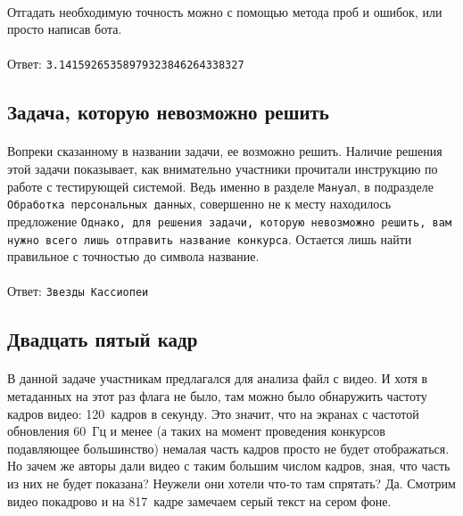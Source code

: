 \documentclass[12pt]{article}
\begin{document}
    \paragraph{}
    Отгадать необходимую точность можно с помощью метода проб и ошибок, или просто написав бота.
    \paragraph{}
    Ответ: \verb|3.14159265358979323846264338327|


    \subsection{Задача, которую невозможно решить}
	\paragraph{}
    Вопреки сказанному в названии задачи, ее возможно решить.
	Наличие решения этой задачи показывает,
	как внимательно участники прочитали инструкцию по работе с тестирующей системой.
	Ведь именно в разделе \verb|Мануал|, в подразделе \verb|Обработка персональных данных|,
	совершенно не к месту находилось предложение
    \verb|Однако, для решения задачи, которую невозможно решить, вам нужно всего лишь отправить название конкурса|.
	Остается лишь найти правильное с точностью до символа название.
    \paragraph{}
    Ответ: \verb|Звезды Кассиопеи|


    \subsection{Двадцать пятый кадр}
	\paragraph{}
    В данной задаче участникам предлагался для анализа файл с видео.
	И хотя в метаданных на этот раз флага не было, там можно было обнаружить частоту кадров видео: 120~кадров в секунду.
	Это значит, что на экранах с частотой обновления 60~Гц и менее
	(а таких на момент проведения конкурсов подавляющее большинство)
	немалая часть кадров просто не будет отображаться.
	Но зачем же авторы дали видео с таким большим числом кадров, зная, что часть из них не будет показана?
	Неужели они хотели что-то там спрятать?
	Да.
	Смотрим видео покадрово и на 817~кадре замечаем серый текст на сером фоне.
\end{document}
